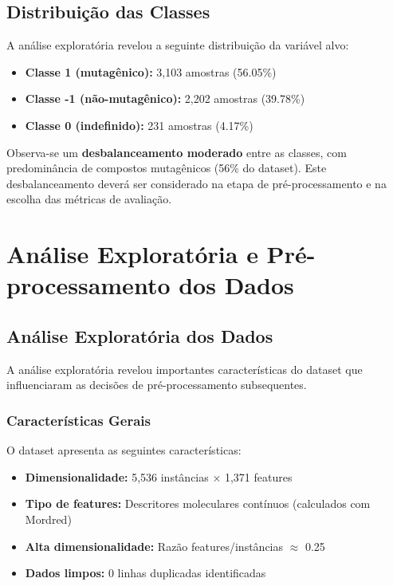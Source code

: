 \documentclass[12pt,a4paper]{article}
\begin{document}
\subsection{Distribuição das Classes}

A análise exploratória revelou a seguinte distribuição da variável alvo:

\begin{itemize}
    \item \textbf{Classe 1 (mutagênico):} 3,103 amostras (56.05\%)
    \item \textbf{Classe -1 (não-mutagênico):} 2,202 amostras (39.78\%)
    \item \textbf{Classe 0 (indefinido):} 231 amostras (4.17\%)
\end{itemize}

Observa-se um \textbf{desbalanceamento moderado} entre as classes, com predominância de compostos mutagênicos (56\% do dataset). Este desbalanceamento deverá ser considerado na etapa de pré-processamento e na escolha das métricas de avaliação.

\section{Análise Exploratória e Pré-processamento dos Dados}

\subsection{Análise Exploratória dos Dados}

A análise exploratória revelou importantes características do dataset que influenciaram as decisões de pré-processamento subsequentes.

\subsubsection{Características Gerais}

O dataset apresenta as seguintes características:

\begin{itemize}
    \item \textbf{Dimensionalidade:} 5,536 instâncias × 1,371 features
    \item \textbf{Tipo de features:} Descritores moleculares contínuos (calculados com Mordred)
    \item \textbf{Alta dimensionalidade:} Razão features/instâncias $\approx$ 0.25
    \item \textbf{Dados limpos:} 0 linhas duplicadas identificadas
\end{itemize}
\end{document}
